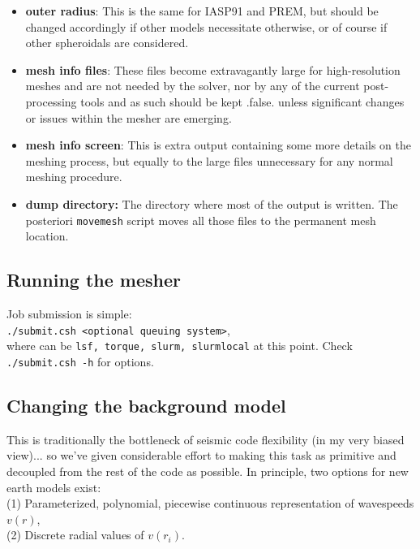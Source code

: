 \documentclass[11pt,letter,fleqn,english,notitlepage]{article}
\begin{document}
\begin{itemize}
    \item \textbf{outer radius}: This is the same for IASP91 and PREM, but
    should be changed accordingly if other models necessitate otherwise, or of
    course if other spheroidals are considered. 
    
    \item \textbf{mesh info files}: These files become extravagantly large for
    high-resolution meshes and are not needed by the solver, nor by any of the
    current post-processing tools and as such should be kept .false. unless
    significant changes or issues within the mesher are emerging.
    
    \item \textbf{mesh info screen}: This is extra output containing some more
    details on the meshing process, but equally to the large files unnecessary
    for any normal meshing procedure.
    
    \item \textbf{dump directory:} The directory where most of the output is
    written. The posteriori {\tt movemesh} script moves all those files to the
    permanent mesh location.
    
\end{itemize}


\subsection{Running the mesher}
Job submission is simple:\\
{\tt ./submit.csh <optional queuing system>},\\
where {\tt <optional queuing system>} can be {\tt lsf, torque, slurm,
slurmlocal} at this point. Check {\tt ./submit.csh -h} for options.

\subsection{Changing the background model}
This is traditionally the bottleneck of seismic code flexibility (in my very
biased view)... so we've given considerable effort to making this task as
primitive and decoupled from the rest of the code as possible. In principle,
two options for new earth models exist: \\ (1) Parameterized, polynomial,
piecewise continuous representation of wavespeeds $v(r)$,\\ (2) Discrete radial
values of $v(r_i)$.\\
\end{document}
